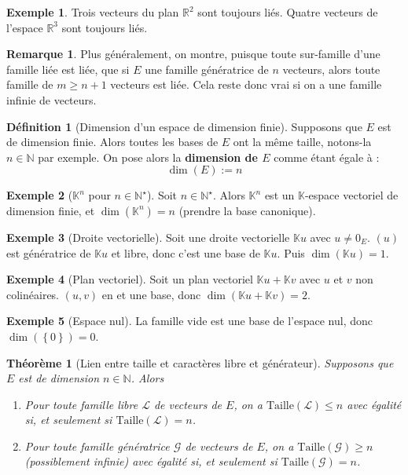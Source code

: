 \documentclass[french]{book}
\newcommand{\N}{\mathbb{N}}
\newcommand{\R}{\mathbb{R}}
\newcommand{\K}{\mathbb{K}}
\newcommand{\st}{^\star}
\theoremstyle{plain}
\newtheorem{thm}{Théorème}[chapter]
\theoremstyle{definition}
\newtheorem{dfn}{Définition}[chapter]
\newtheorem{exa}{Exemple}[chapter]
\newtheorem{rmq}{Remarque}[chapter]
\theoremstyle{remark}
\begin{document}
\begin{exa}
	Trois vecteurs du plan $\R^2$ sont toujours liés. Quatre vecteurs de l'espace $\R^3$ sont toujours liés.
\end{exa}
\begin{rmq}
	Plus généralement, on montre, puisque toute sur-famille d'une famille liée est liée, que si $E$ une famille génératrice de $n$ vecteurs, alors toute famille de $m\geqslant n+1$ vecteurs est liée. Cela reste donc vrai si on a une famille infinie de vecteurs.
\end{rmq}
\begin{dfn}[Dimension d'un espace de dimension finie]
	Supposons que $E$ est de dimension finie. Alors toutes les bases de $E$ ont la même taille, notons-la $n\in\N$ par exemple. On pose alors la \textbf{dimension de $E$} comme étant égale à : $$\dim(E):=n$$
\end{dfn}
\begin{exa}[$\K^n$ pour $n\in\N\st$]
	Soit $n\in\N\st$. Alors $\K^n$ est un $\K$-espace vectoriel de dimension finie, et $\dim(\K^n)=n$ (prendre la base canonique).
\end{exa}
\begin{exa}[Droite vectorielle]
	Soit une droite vectorielle $\K u$ avec $u\ne0_E$. $(u)$ est génératrice de $\K u$ et libre, donc c'est une base de $\K u$. Puis $\dim(\K u)=1$.
\end{exa}
\begin{exa}[Plan vectoriel]
	Soit un plan vectoriel $\K u+\K v$ avec $u$ et $v$ non colinéaires. $(u,v)$ en et une base, donc $\dim(\K u+\K v)=2$.
\end{exa}
\begin{exa}[Espace nul]
	La famille vide est une base de l'espace nul, donc $\dim(\left\{0\right\})=0$.
\end{exa}
\begin{thm}[Lien entre taille et caractères libre et générateur]
	Supposons que $E$ est de dimension $n\in\N$. Alors
	\begin{enumerate}
		\item Pour toute famille libre $\mathcal{L}$ de vecteurs de $E$, on a $\text{Taille}(\mathcal{L})\leqslant n$ avec égalité si, et seulement si $\text{Taille}(\mathcal{L})=n$.
		\item Pour toute famille génératrice $\mathcal{G}$ de vecteurs de $E$, on a $\text{Taille}(\mathcal{G})\geqslant n$ (possiblement infinie) avec égalité si, et seulement si $\text{Taille}(\mathcal{G})=n$.
	\end{enumerate}
\end{thm}
\end{document}
